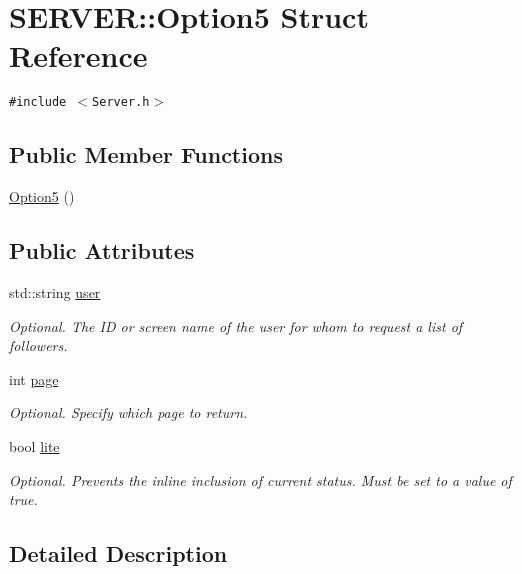 \hypertarget{structSERVER_1_1Option5}{
\section{SERVER::Option5 Struct Reference}
\label{structSERVER_1_1Option5}
}
{\tt \#include $<$Server.h$>$}

\subsection*{Public Member Functions}
\begin{CompactItemize}
\item 
\hyperlink{structSERVER_1_1Option5_7d84350b26df14847f34a16682d4e265}{Option5} ()
\end{CompactItemize}
\subsection*{Public Attributes}
\begin{CompactItemize}
\item 
std::string \hyperlink{structSERVER_1_1Option5_edba226344f8de6938f0ee804cb5fe10}{user}
\begin{CompactList}\small\item\em Optional. The ID or screen name of the user for whom to request a list of followers. \item\end{CompactList}\item 
int \hyperlink{structSERVER_1_1Option5_629b118bef583584f946c6acea5909e9}{page}
\begin{CompactList}\small\item\em Optional. Specify which page to return. \item\end{CompactList}\item 
bool \hyperlink{structSERVER_1_1Option5_18f4978757ae6b72d8007976964c7d71}{lite}
\begin{CompactList}\small\item\em Optional. Prevents the inline inclusion of current status. Must be set to a value of true. \item\end{CompactList}\end{CompactItemize}


\subsection{Detailed Description}


